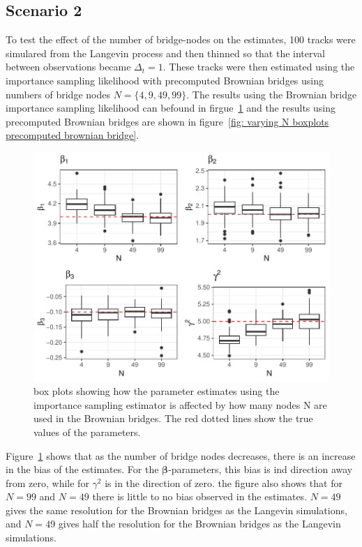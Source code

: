\subsection{Scenario 2}
To test the effect of the number of bridge-nodes on the estimates, 100 tracks were simulared from the Langevin process and then thinned so that the interval between observations became $\Delta_t =1$. These tracks were then estimated using the importance sampling likelihood with precomputed Brownian bridges using numbers of bridge nodes $N =\{4,9,49,99\}$. The results using the Brownian bridge importance sampling likelihood can befound in firgue~\ref{fig: varying N boxplots brownian bridge} and the results using precomputed Brownian bridges are shown in figure~\ref{fig: varying N boxplots precomputed brownian bridge}. 

\begin{figure}[H]
    \centering
    \includegraphics[width=\linewidth]{Images/Results/varying N estimates BB.pdf}
    \caption[Box plots of Parameter Estimates using Brownian bridge importance sampling using different number of bridge nodes]{box plots showing how the parameter estimates using the importance sampling estimator is affected by how many nodes N are used in the Brownian bridges. The red dotted lines show the true values of the parameters.}
    \label{fig: varying N boxplots brownian bridge}
\end{figure}

Figure~\ref{fig: varying N boxplots brownian bridge} shows that as the number of bridge nodes decreases, there is an increase in the bias of the estimates. For the $\bm \beta$-parameters, this bias is ind direction away from zero, while for $\gamma^2$ is in the direction of zero. the figure also shows that for $N=99$ and $N=49$ there is little to no bias observed in the estimates. $N = 49$ gives the same resolution for the Brownian bridges as the Langevin simulations, and $N=49$ gives half the resolution for the Brownian bridges as the Langevin simulations.

